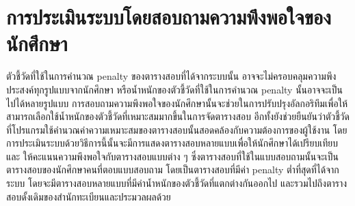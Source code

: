 \section{การประเมินระบบโดยสอบถามความพึงพอใจของนักศึกษา}
ตัวชี้วัดที่ใช้ในการคำนวณ penalty ของตารางสอบที่ได้จากระบบนั้น อาจจะไม่ครอบคลุมความพึงประสงค์ทุกรูปแบบจากนักศึกษา หรือน้ำหนักของตัวชี้วัดที่ใช้ในการคำนวณ penalty นั้นอาจจะเป็นไปได้หลายรูปแบบ
\enskip การสอบถามความพึงพอใจของนักศึกษานั้นจะช่วยในการปรับปรุงอัลกอริทึมเพื่อให้สามารถเลือกใช้น้ำหนักของตัวชี้วัดที่เหมาะสมมากขึ้นในการจัดตารางสอบ
อีกทั้งยังช่วยยืนยันว่าตัวชี้วัดที่โปรแกรมใช้คํานวณค่าความเหมาะสมของตารางสอบนั้นสอดคล้องกับความต้องการของผู้ใช้งาน 
\enskip โดยการประเมินระบบด้วยวิธีการนี้นั้นจะมีการแสดงตารางสอบหลายแบบเพื่อให้นักศึกษาได้เปรียบเทียบและ
ให้คะแนนความพึงพอใจกับตารางสอบแบบต่าง ๆ ซึ่งตารางสอบที่ใช้ในแบบสอบถามนั้นจะเป็นตารางสอบของนักศึกษาคนที่ตอบแบบสอบถาม 
โดยเป็นตารางสอบที่มีค่า penalty ต่ำที่สุดที่ได้จากระบบ โดยจะมีตารางสอบหลายแบบที่มีค่าน้ำหนักของตัวชี้วัดที่แตกต่างกันออกไป 
และรวมไปถึงตารางสอบดั้งเดิมของสำนักทะเบียนและประมวลผลด้วย
